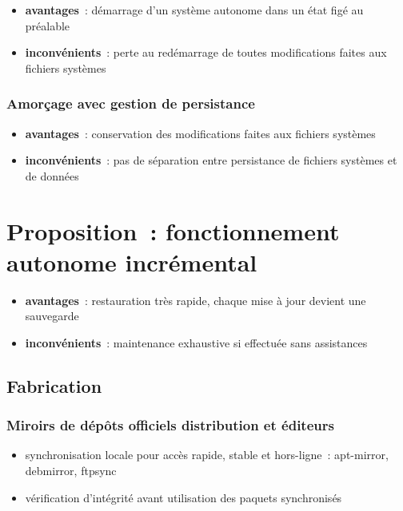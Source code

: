 \documentclass[10pt]{article}
\newenvironment{itmz}{\begin{itemize}
\setlength{\itemsep}{0em}
}{\end{itemize}}
\begin{document}
\begin{itmz}
\item{\textbf{avantages} : démarrage d’un système autonome dans un état figé au préalable}
\item{\textbf{inconvénients} : perte au redémarrage de toutes modifications faites aux fichiers systèmes}
\end{itmz}

\subsubsection{Amorçage avec gestion de persistance}

\begin{itmz}
\item{\textbf{avantages} : conservation des modifications faites aux fichiers systèmes}
\item{\textbf{inconvénients} : pas de séparation entre persistance de fichiers systèmes et de données}
\end{itmz}

\section{Proposition : fonctionnement autonome incrémental}

\begin{itmz}
\item{\textbf{avantages} : restauration très rapide, chaque mise à jour devient une sauvegarde}
\item{\textbf{inconvénients} : maintenance exhaustive si effectuée sans assistances}
\end{itmz}

\subsection{Fabrication}

\subsubsection{Miroirs de dépôts officiels distribution et éditeurs}

\begin{itmz}
\item{synchronisation locale pour accès rapide, stable et hors-ligne : apt-mirror, debmirror, ftpsync}
\item{vérification d’intégrité avant utilisation des paquets synchronisés}
\end{itmz}
\end{document}
